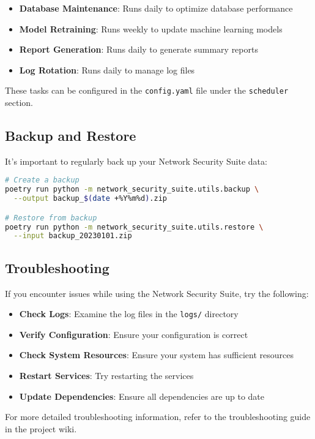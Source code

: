 \begin{itemize}
    \item \textbf{Database Maintenance}: Runs daily to optimize database performance
    \item \textbf{Model Retraining}: Runs weekly to update machine learning models
    \item \textbf{Report Generation}: Runs daily to generate summary reports
    \item \textbf{Log Rotation}: Runs daily to manage log files
\end{itemize}

These tasks can be configured in the \texttt{config.yaml} file under the \texttt{scheduler} section.

\subsection{Backup and Restore}
It's important to regularly back up your Network Security Suite data:

\begin{lstlisting}[language=bash, caption=Backup and Restore]
# Create a backup
poetry run python -m network_security_suite.utils.backup \
  --output backup_$(date +%Y%m%d).zip

# Restore from backup
poetry run python -m network_security_suite.utils.restore \
  --input backup_20230101.zip
\end{lstlisting}

\subsection{Troubleshooting}
If you encounter issues while using the Network Security Suite, try the following:

\begin{itemize}
    \item \textbf{Check Logs}: Examine the log files in the \texttt{logs/} directory
    \item \textbf{Verify Configuration}: Ensure your configuration is correct
    \item \textbf{Check System Resources}: Ensure your system has sufficient resources
    \item \textbf{Restart Services}: Try restarting the services
    \item \textbf{Update Dependencies}: Ensure all dependencies are up to date
\end{itemize}

For more detailed troubleshooting information, refer to the troubleshooting guide in the project wiki.